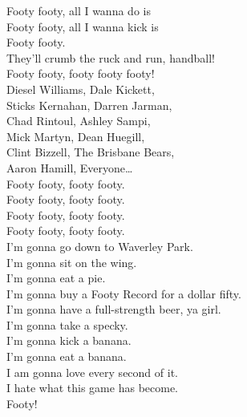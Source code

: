 Footy footy, all I wanna do is \\
Footy footy, all I wanna kick is \\
Footy footy. \\
They’ll crumb the ruck and run, handball! \\
Footy footy, footy footy footy! \\

Diesel Williams, Dale Kickett, \\
Sticks Kernahan, Darren Jarman, \\
Chad Rintoul, Ashley Sampi, \\
Mick Martyn, Dean Huegill, \\
Clint Bizzell, The Brisbane Bears, \\
Aaron Hamill, Everyone… \\

Footy footy, footy footy. \\
Footy footy, footy footy. \\
Footy footy, footy footy. \\
Footy footy, footy footy. \\

I'm gonna go down to Waverley Park. \\
I'm gonna sit on the wing. \\
I'm gonna eat a pie. \\
I'm gonna buy a Footy Record for a dollar fifty. \\
I'm gonna have a full-strength beer, ya girl. \\
I'm gonna take a specky. \\
I'm gonna kick a banana. \\
I'm gonna eat a banana. \\
I am gonna love every second of it. \\
I hate what this game has become. \\

Footy! \\
